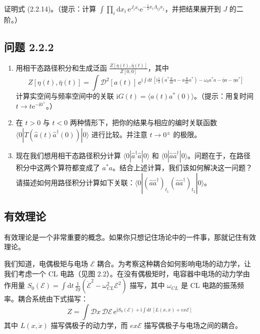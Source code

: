 证明式 (2.2.14)。（提示：计算 $\int\prod_i\mathrm{d}x_i\,\mathrm{e}^{J_ix_i}\mathrm{e}^{-\frac{1}{2}x_i\Lambda_{ij}x_j}$，并把结果展开到 $J$ 的二阶。）

\subsection*{问题 2.2.2}

\begin{enumerate}
\item[(a)] 用相干态路径积分和生成泛函 $\frac{Z[\eta(t),\bar{\eta}(t)]}{Z[0,0]}$，其中
\begin{equation*}
Z[\eta(t),\bar{\eta}(t)]=\int\mathcal{D}^2[a(t)]\,\mathrm{e}^{\mathrm{i}\int\mathrm{d}t\,\left[\mathrm{i}\frac{1}{2}\left(a^*\frac{\mathrm{d}}{\mathrm{d}t}a-a\frac{\mathrm{d}}{\mathrm{d}t}a^*\right)-\omega_0a^*a-\bar{\eta}a-\eta a^*\right]}
\end{equation*}
计算实空间与频率空间中的关联 $\mathrm{i}G(t)=\langle a(t)a^*(0)\rangle$。（提示：用复时间 $t\to t\mathrm{e}^{-\mathrm{i}0^+}$。）
\item[(b)] 在 $t>0$ 与 $t<0$ 两种情形下，把你的结果与相应的编时关联函数 $\langle 0|T(\hat{a}(t)\hat{a}^\dagger(0))|0\rangle$ 进行比较。并注意 $t\to 0^\pm$ 的极限。
\item[(c)] 现在我们想用相干态路径积分计算 $\langle 0|\hat{a}^\dagger\hat{a}|0\rangle$ 和 $\langle 0|\hat{a}\hat{a}^\dagger|0\rangle$。问题在于，在路径积分中这两个算符都变成了 $a^*a$。结合上述计算，我们该如何解决这一问题？请描述如何用路径积分计算如下关联：$\langle 0|(\hat{a}\hat{a}^\dagger)_{t_1}(\hat{a}\hat{a}^\dagger)_{t_2}|0\rangle$。
\end{enumerate}

\subsection{有效理论}

\begin{keypoints}
\item 有效理论是一个非常重要的概念。如果你只想记住场论中的一件事，那就记住有效理论。
\end{keypoints}

我们知道，电偶极矩与电场 $\mathcal{E}$ 耦合。为考察这种耦合如何影响电场的动力学，让我们考虑一个 CL 电路（见图 2.2）。在没有偶极矩时，电容器中电场的动力学由作用量 $S_0(\mathcal{E})=\int\mathrm{d}t\,\frac{1}{2g}(\dot{\mathcal{E}}^2-\omega_{CL}^2\mathcal{E}^2)$ 描写，其中 $\omega_{CL}$ 是 CL 电路的振荡频率。耦合系统由下式描写：
\begin{equation*}
Z=\int\mathcal{D}x\,\mathcal{D}\mathcal{E}\,\mathrm{e}^{\mathrm{i}S_0(\mathcal{E})+\mathrm{i}\int\mathrm{d}t\,[L(x,\dot{x})+ex\mathcal{E}]}
\end{equation*}
其中 $L(x,\dot{x})$ 描写偶极子的动力学，而 $ex\mathcal{E}$ 描写偶极子与电场之间的耦合。

